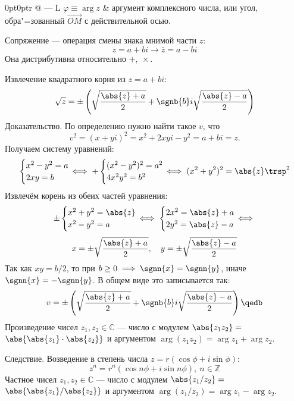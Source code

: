 \begin{tabularcx}{0pt}{0pt}{r @{ --- } L}{\textwidth}
$\varphi\equiv\arg z$ & {\ital аргумент комплексного числа}, или угол, обра"=зованный $\overrightarrow{OM}$ с действительной осью.
\end{tabularcx}

{\bold Сопряжение} --- операция смены знака мнимой части $z$:
$$z=a+bi\to\bar{z}=a-bi$$
Она {\ital дистрибутивна} относительно $+,\ \times$.

Извлечение квадратного корня из $z=a+bi$:
$$\sqrt{z}=\pm\left(\sqrt{\frac{\abs{z}+a}{2}}+\sgnb{b}i\sqrt{\frac{\abs{z}-a}{2}}\right)
$$
{\bold Доказательство.} По определению нужно найти такое $v$, что
$$v^2=(x+yi)^2=x^2+2xyi-y^2=a+bi=z.$$
Получаем систему уравнений:
$$\begin{cases}
x^2-y^2=a\\
2xy=b
\end{cases}\hspace*{-12pt}\iff
+\begin{cases}
(x^2-y^2)^2=a^2\\
4x^2y^2=b^2
\end{cases}\hspace*{-12pt}\iff
(x^2+y^2)^2=\abs{z}\trsp^2$$
Извлечём корень из обеих частей уравнения:
$$\pm\begin{cases}
x^2+y^2=\abs{z}\\
x^2-y^2=a
\end{cases}\hspace*{-12pt}\iff
\begin{cases}
2x^2=\abs{z}+a\\
2y^2=\abs{z}-a
\end{cases}\hspace*{-12pt}\iff$$
$$x=\pm\sqrt{\frac{\abs{z}+a}{2}},\quad y=\pm\sqrt{\frac{\abs{z}-a}{2}}$$
Так как $xy=b/2$, то при $b\geq 0\implies\sgnn{x}=\sgnn{y}$, иначе
$\sgnn{x}=-\sgnn{y}$. В общем виде это записывается так:
$$v=\pm\left(\sqrt{\frac{\abs{z}+a}{2}}+\sgnb{b}i\sqrt{\frac{\abs{z}-a}{2}}\right)\qedb$$
Произведение чисел $z_1,z_2\in\mathbb{C}$ --- число с модулем $\abs{z_1z_2}=$
$\abs{\abs{z_1}\cdot\abs{z_2}}$ и аргументом $\arg(z_1z_2)=\arg z_1+\arg z_2$.

{\bold Следствие.} Возведение в степень числа $z=r(\cos\phi+i\sin\phi)$:
$$z^n=r^n(\cos n\phi+i\sin n\phi),\ n\in\mathbb{Z}$$
Частное чисел $z_1,z_2\in\mathbb{C}$ --- число с модулем $\abs{z_1/z_2}=$
$\abs{\abs{z_1}/\abs{z_2}}$ и аргументом $\arg(z_1/z_2)=\arg z_1-\arg z_2$.

